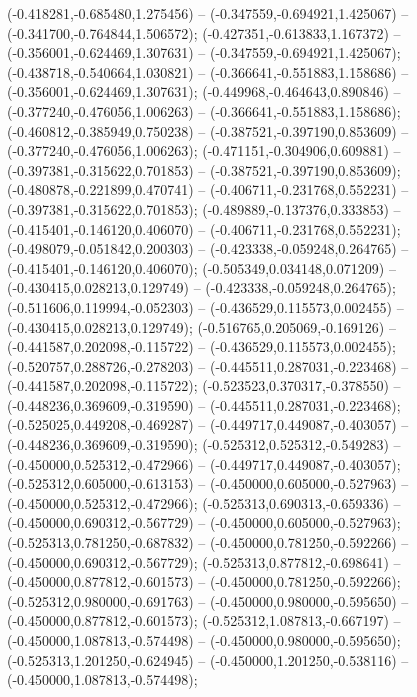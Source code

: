  (-0.418281,-0.685480,1.275456) -- (-0.347559,-0.694921,1.425067) -- (-0.341700,-0.764844,1.506572);
 (-0.427351,-0.613833,1.167372) -- (-0.356001,-0.624469,1.307631) -- (-0.347559,-0.694921,1.425067);
 (-0.438718,-0.540664,1.030821) -- (-0.366641,-0.551883,1.158686) -- (-0.356001,-0.624469,1.307631);
 (-0.449968,-0.464643,0.890846) -- (-0.377240,-0.476056,1.006263) -- (-0.366641,-0.551883,1.158686);
 (-0.460812,-0.385949,0.750238) -- (-0.387521,-0.397190,0.853609) -- (-0.377240,-0.476056,1.006263);
 (-0.471151,-0.304906,0.609881) -- (-0.397381,-0.315622,0.701853) -- (-0.387521,-0.397190,0.853609);
 (-0.480878,-0.221899,0.470741) -- (-0.406711,-0.231768,0.552231) -- (-0.397381,-0.315622,0.701853);
 (-0.489889,-0.137376,0.333853) -- (-0.415401,-0.146120,0.406070) -- (-0.406711,-0.231768,0.552231);
 (-0.498079,-0.051842,0.200303) -- (-0.423338,-0.059248,0.264765) -- (-0.415401,-0.146120,0.406070);
 (-0.505349,0.034148,0.071209) -- (-0.430415,0.028213,0.129749) -- (-0.423338,-0.059248,0.264765);
 (-0.511606,0.119994,-0.052303) -- (-0.436529,0.115573,0.002455) -- (-0.430415,0.028213,0.129749);
 (-0.516765,0.205069,-0.169126) -- (-0.441587,0.202098,-0.115722) -- (-0.436529,0.115573,0.002455);
 (-0.520757,0.288726,-0.278203) -- (-0.445511,0.287031,-0.223468) -- (-0.441587,0.202098,-0.115722);
 (-0.523523,0.370317,-0.378550) -- (-0.448236,0.369609,-0.319590) -- (-0.445511,0.287031,-0.223468);
 (-0.525025,0.449208,-0.469287) -- (-0.449717,0.449087,-0.403057) -- (-0.448236,0.369609,-0.319590);
 (-0.525312,0.525312,-0.549283) -- (-0.450000,0.525312,-0.472966) -- (-0.449717,0.449087,-0.403057);
 (-0.525312,0.605000,-0.613153) -- (-0.450000,0.605000,-0.527963) -- (-0.450000,0.525312,-0.472966);
 (-0.525313,0.690313,-0.659336) -- (-0.450000,0.690312,-0.567729) -- (-0.450000,0.605000,-0.527963);
 (-0.525313,0.781250,-0.687832) -- (-0.450000,0.781250,-0.592266) -- (-0.450000,0.690312,-0.567729);
 (-0.525313,0.877812,-0.698641) -- (-0.450000,0.877812,-0.601573) -- (-0.450000,0.781250,-0.592266);
 (-0.525312,0.980000,-0.691763) -- (-0.450000,0.980000,-0.595650) -- (-0.450000,0.877812,-0.601573);
 (-0.525312,1.087813,-0.667197) -- (-0.450000,1.087813,-0.574498) -- (-0.450000,0.980000,-0.595650);
 (-0.525313,1.201250,-0.624945) -- (-0.450000,1.201250,-0.538116) -- (-0.450000,1.087813,-0.574498);
